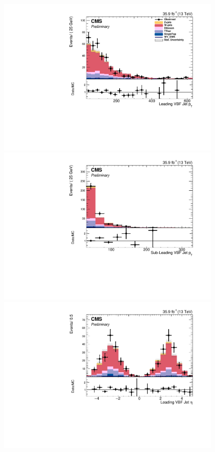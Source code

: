 \begin{figure}[htb]
\includegraphics[width=\cmsFigWidth]{Plots/plots/DibosonBoostedElMuCuts13TeV_WjetControlRegion_Tighter_CHS_vbf_maxpt_j1_pt.pdf}
\includegraphics[width=\cmsFigWidth]{Plots/plots/DibosonBoostedElMuCuts13TeV_WjetControlRegion_Tighter_CHS_vbf_maxpt_j2_pt.pdf}
\includegraphics[width=\cmsFigWidth]{Plots/plots/DibosonBoostedElMuCuts13TeV_WjetControlRegion_Tighter_CHS_vbf_maxpt_j1_eta.pdf}

\end{figure}
